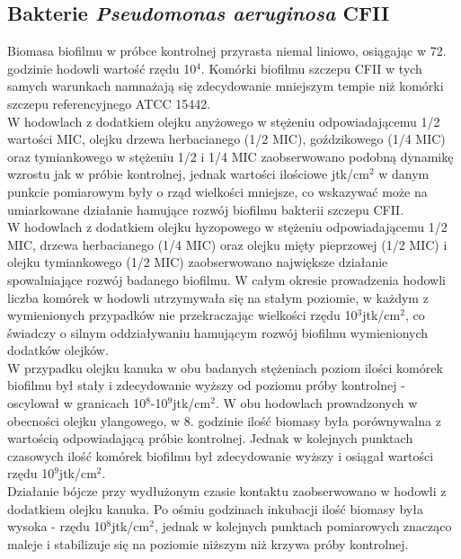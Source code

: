 \documentclass[11pt,a4paper]{report}
\begin{document}
\subsection{Bakterie \textit{Pseudomonas aeruginosa} CFII}
Biomasa biofilmu w próbce kontrolnej przyrasta niemal liniowo, osiągając w 72. godzinie hodowli wartość rzędu 10$^4$.
Komórki biofilmu szczepu CFII w tych samych warunkach namnażają się zdecydowanie mniejszym tempie niż komórki szczepu referencyjnego ATCC 15442.\\
W hodowlach z dodatkiem olejku anyżowego w stężeniu odpowiadającemu 1/2 wartości MIC, olejku drzewa herbacianego (1/2 MIC), goździkowego (1/4 MIC) oraz tymiankowego w stężeniu 1/2 i 1/4 MIC zaobserwowano podobną dynamikę wzrostu jak w próbie kontrolnej, jednak wartości ilościowe jtk/cm$^2$ w danym punkcie pomiarowym były o rząd wielkości mniejsze, co wskazywać może na umiarkowane działanie hamujące rozwój biofilmu bakterii szczepu CFII.\\
W hodowlach z dodatkiem olejku hyzopowego w stężeniu odpowiadającemu 1/2 MIC, drzewa herbacianego (1/4 MIC) oraz olejku mięty pieprzowej (1/2 MIC) i olejku tymiankowego (1/2 MIC) zaobserwowano największe działanie spowalniające rozwój badanego biofilmu. W całym okresie prowadzenia hodowli liczba komórek w hodowli utrzymywała się na stałym poziomie, w każdym z wymienionych przypadków nie przekraczając wielkości rzędu 10$^3$jtk/cm$^2$, co świadczy o silnym oddziaływaniu hamującym rozwój biofilmu wymienionych dodatków olejków.\\
W przypadku olejku kanuka w obu badanych stężeniach poziom ilości komórek biofilmu był stały i zdecydowanie wyższy od poziomu próby kontrolnej - oscylował w granicach 10$^8$-10$^9$jtk/cm$^2$.
W obu hodowlach prowadzonych w obecności olejku ylangowego, w 8. godzinie ilość biomasy była porównywalna z wartością odpowiadającą próbie kontrolnej. Jednak w kolejnych punktach czasowych ilość komórek biofilmu był zdecydowanie wyższy i osiągał wartości rzędu 10$^9$jtk/cm$^2$.\\
Działanie bójcze przy wydłużonym czasie kontaktu zaobserwowano w hodowli z dodatkiem olejku kanuka. Po ośmiu godzinach inkubacji ilość biomasy była wysoka - rzędu 10$^8$jtk/cm$^2$, jednak w kolejnych punktach pomiarowych znacząco maleje i stabilizuje się na poziomie niższym niż krzywa próby kontrolnej.
\end{document}
